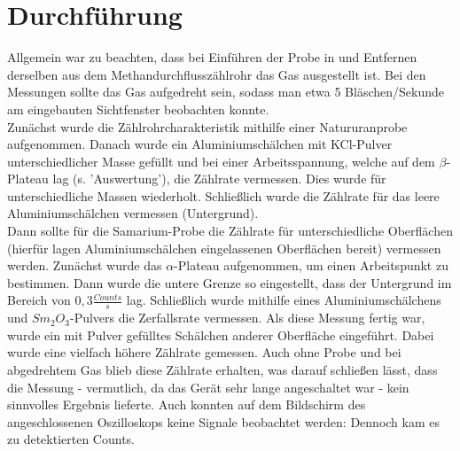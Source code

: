 \section{Durchführung}
Allgemein war zu beachten, dass bei Einführen der Probe in und Entfernen derselben aus dem Methandurchflusszählrohr das Gas ausgestellt ist. Bei den Messungen sollte das Gas aufgedreht sein, sodass man etwa 5 Bläschen/Sekunde am eingebauten Sichtfenster beobachten konnte. \\
Zunächst wurde die Zählrohrcharakteristik mithilfe einer Natururanprobe aufgenommen. Danach wurde ein Aluminiumschälchen mit KCl-Pulver unterschiedlicher Masse gefüllt und bei einer Arbeitsspannung, welche auf dem $\beta$-Plateau lag (s. 'Auswertung'), die Zählrate vermessen. Dies wurde für unterschiedliche Massen wiederholt. Schließlich wurde die Zählrate für das leere Aluminiumschälchen vermessen (Untergrund). \\
Dann sollte für die Samarium-Probe die Zählrate für unterschiedliche Oberflächen (hierfür lagen Aluminiumschälchen eingelassenen Oberflächen bereit) vermessen werden. Zunächst wurde das $\alpha$-Plateau aufgenommen, um einen Arbeitspunkt zu bestimmen. Dann wurde die untere Grenze so eingestellt, dass der Untergrund im Bereich von $0,3\frac{Counts}{s}$ lag. Schließlich wurde mithilfe eines Aluminiumschälchens und $Sm_{2}O_{3}$-Pulvers die Zerfallsrate vermessen. Als diese Messung fertig war, wurde ein mit Pulver gefülltes Schälchen anderer Oberfläche eingeführt. Dabei wurde eine vielfach höhere Zählrate gemessen. Auch ohne Probe und bei abgedrehtem Gas blieb diese Zählrate erhalten, was darauf schließen lässt, dass die Messung - vermutlich, da das Gerät sehr lange angeschaltet war - kein sinnvolles Ergebnis lieferte. Auch konnten auf dem Bildschirm des angeschlossenen Oszilloskops keine Signale beobachtet werden: Dennoch kam es zu detektierten Counts.